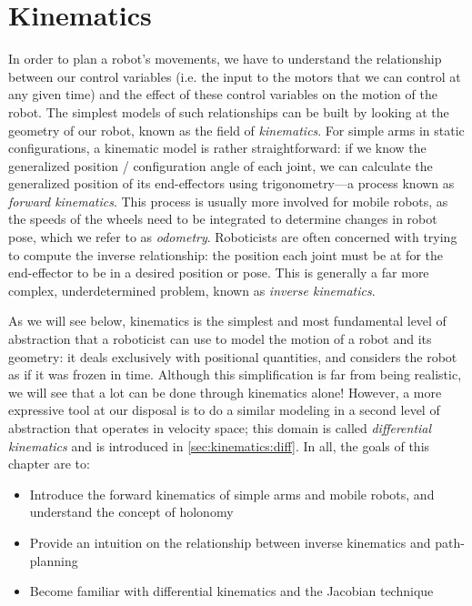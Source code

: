 \chapter{Kinematics}\label{chap:kinematics}

In order to plan a robot's movements, we have to understand the relationship between our control variables (i.e. the input to the motors that we can control at any given time) and the effect of these control variables on the motion of the robot.
The simplest models of such relationships can be built by looking at the geometry of our robot, known as the field of \textsl{kinematics}.
For simple arms in static configurations, a kinematic model is rather straightforward: if we know the generalized position / configuration angle of each joint, we can calculate the generalized position of its end-effectors using trigonometry---a process known as \textsl{forward kinematics}.
This process is usually more involved for mobile robots, as the speeds of the wheels need to be integrated to determine changes in robot pose, which we refer to as \textsl{odometry}.
Roboticists are often concerned with trying to compute the inverse relationship: the position each joint must be at for the end-effector to be in a desired position or pose. This is generally a far more complex, underdetermined problem, known as \textsl{inverse kinematics}.

As we will see below, kinematics is the simplest and most fundamental level of abstraction that a roboticist can use to model the motion of a robot and its geometry: it deals exclusively with positional quantities, and considers the robot as if it was frozen in time. Although this simplification is far from being realistic, we will see that a lot can be done through kinematics alone! However, a more expressive tool at our disposal is to do a similar modeling in a second level of abstraction that operates in velocity space; this domain is called \textsl{differential kinematics} and is introduced in \cref{sec:kinematics:diff}.
In all, the goals of this chapter are to:

\begin{itemize}
\item Introduce the forward kinematics of simple arms and mobile robots, and understand the concept of holonomy
\item Provide an intuition on the relationship between inverse kinematics and path-planning
\item Become familiar with differential kinematics and the Jacobian technique
\end{itemize}

